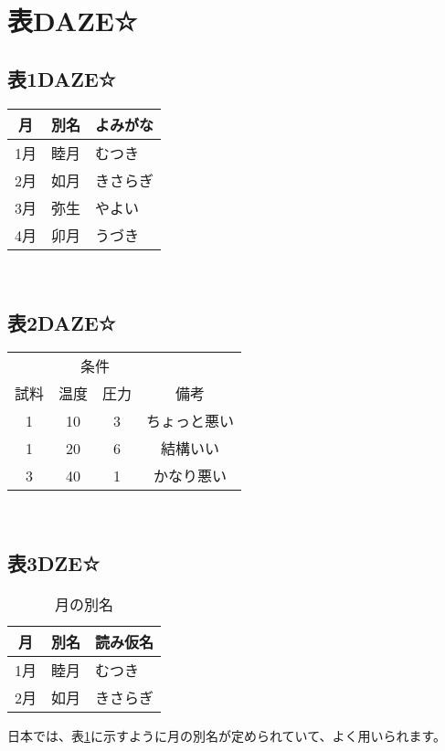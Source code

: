 \documentclass[a4paper, uplatex]{jlreq}
\newcommand{\明石}{明石工業高等専門がおっこう電機情報工学科}
\begin{document}
	\section{表DAZE☆}
	\subsection{表1DAZE☆} 
	\begin{tabular}{|c|l|p{15mm}|} \hline
		月& 別名& よみがな\\ \hline\hline
		1月& 睦月& むつき\\
		2月& 如月& きさらぎ\\
		3月& 弥生& やよい\\
		4月& 卯月& うづき\\ \hline 
	\end{tabular} \\
	\subsection{表2DAZE☆}
	\begin{tabular}{|c|c|c|c|}\hline
		& \multicolumn{2}{|c|}{条件} & \\ \cline{2-3}
		試料& 温度 & 圧力 & 備考 \\ \hline
		1 & 10 & 3 & ちょっと悪い \\ \hline
		1 & 20 & 6 & 結構いい\\
		3 & 40 & 1 & かなり悪い　\\ \hline
	\end{tabular} \\
	\subsection{表3DZE☆}
	\begin{table}[http]
		\centering
		\caption{月の別名}
		\label{month-name}
		\begin{tabular}[t]{|c|l|p{15mm}|}\hline
			月& 別名& 読み仮名\\ \hline\hline
			1月& 睦月& むつき\\
			2月& 如月& きさらぎ\\ \hline
		\end{tabular}
	\end{table}
	日本では、表\ref{month-name}に示すように月の別名が定められていて、よく用いられます。
	
\end{document}
